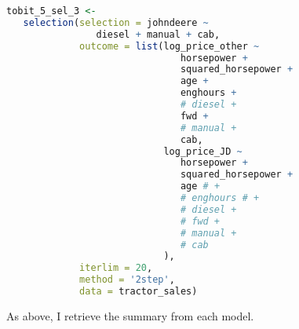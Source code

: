 \begin{lstlisting}[language=R]
tobit_5_sel_3 <-
   selection(selection = johndeere ~
                diesel + manual + cab,
             outcome = list(log_price_other ~
                               horsepower +
                               squared_horsepower +
                               age +
                               enghours +
                               # diesel +
                               fwd +
                               # manual +
                               cab,
                            log_price_JD ~
                               horsepower +
                               squared_horsepower +
                               age # +
                               # enghours # +
                               # diesel +
                               # fwd +
                               # manual +
                               # cab
                            ),
             iterlim = 20,
             method = '2step',
             data = tractor_sales)

\end{lstlisting}

As above, I retrieve the summary from each model.

